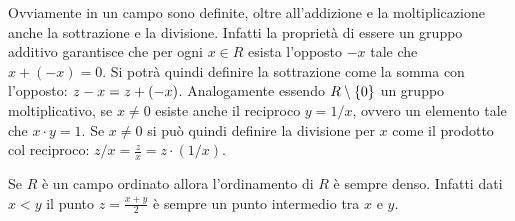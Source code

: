 Ovviamente in un campo sono definite, oltre all'addizione e la moltiplicazione anche 
la sottrazione e la divisione. 
Infatti la proprietà di essere un gruppo additivo garantisce che 
per ogni $x\in R$ esista l'opposto $-x$ tale che $x+(-x)=0$.
Si potrà quindi definire la sottrazione come la somma con l'opposto: 
$z-x = z + (-x)$.
Analogamente essendo $R\setminus{\left\{ 0 \right\}}$ un gruppo moltiplicativo,
se $x\neq 0$ esiste anche il reciproco $y=1/x$, 
ovvero un elemento tale che $x\cdot y = 1$.
Se $x\neq 0$ si può quindi definire la divisione per $x$ come 
il prodotto col reciproco: $z/x = \frac{z}{x} = z\cdot (1/x)$.

Se $R$ è un campo ordinato allora l'ordinamento di $R$ è sempre denso.
Infatti dati $x<y$ il punto $z=\frac{x+y}{2}$ è sempre 
un punto intermedio tra $x$ e $y$.

